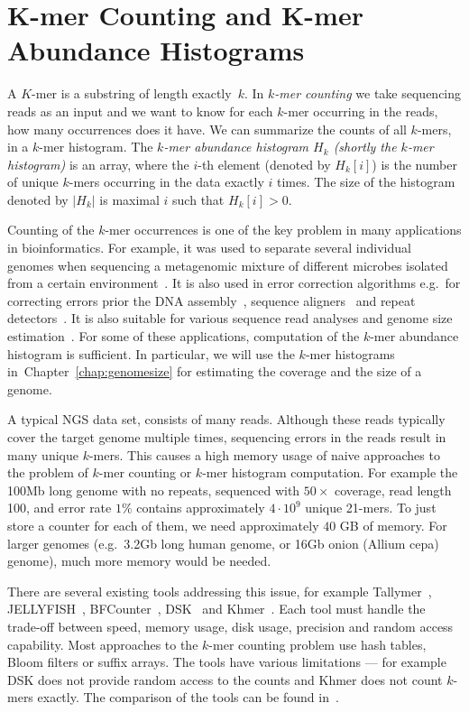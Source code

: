 \chapter[K-mer Counting]{K-mer Counting and K-mer Abundance Histograms}

A $K$-mer is a substring of length exactly~$k$. In \emph{$k$-mer counting} we take sequencing reads as an input and we want to know for each $k$-mer occurring in the reads, how many occurrences does it have. We can summarize the counts of all $k$-mers, in a $k$-mer histogram.
The \emph{$k$-mer abundance histogram $H_k$ (shortly the $k$-mer histogram)} is an array, where the $i$-th element (denoted by $H_k[i]$) is the number of unique $k$-mers occurring in the data exactly $i$ times. The size of the histogram denoted by $|H_k|$ is maximal $i$ such that $H_k[i] > 0$.

Counting of the $k$-mer occurrences is one of the key problem in many applications in bioinformatics.
For example, it was used to separate several individual
genomes when sequencing a metagenomic mixture of different microbes isolated from a certain environment~\cite{Wu2011, Wang2012}.
It is also used in error correction algorithms e.g.\ for correcting errors prior the DNA assembly~\cite{Pevzner2001}, sequence aligners~\cite{edgar2004muscle} and repeat detectors~\cite{caponnetto2013efficiency}.
It is also suitable for various sequence read analyses and genome size estimation~\cite{covest, williams, waterman}.
For some of these applications, computation of the $k$-mer abundance histogram is sufficient.
In particular, we will use the $k$-mer histograms in~Chapter~\ref{chap:genomesize} for estimating the coverage and the size of a genome.

A typical NGS data set, consists of many reads. Although these reads typically cover the target genome multiple times, sequencing errors in the reads result in many unique $k$-mers.
This causes a high memory usage of naive approaches to the problem of $k$-mer counting or $k$-mer histogram computation.
For example the 100Mb long genome with no repeats, sequenced with $50\times$ coverage, read length 100, and error rate $1\%$ contains approximately $4\cdot 10^9$ unique 21-mers. To just store a counter for each of them, we need approximately $40$ GB of memory. For larger genomes (e.g.\ 3.2Gb long human genome, or 16Gb onion (Allium cepa) genome), much more memory would be needed.

There are several existing tools addressing this issue, for example Tallymer~\cite{tallymer}, JELLYFISH~\cite{jellyfish}, BFCounter~\cite{bfcounter}, DSK~\cite{dsk} and Khmer~\cite{khmer}. Each tool must handle the trade-off between speed, memory usage, disk usage, precision and random access capability. Most approaches to the $k$-mer counting problem use hash tables, Bloom filters or suffix arrays.
The tools have various limitations --- for example DSK does not provide random access to the counts and Khmer does not count $k$-mers exactly.
The comparison of the tools can be found in~\cite{khmer}.

